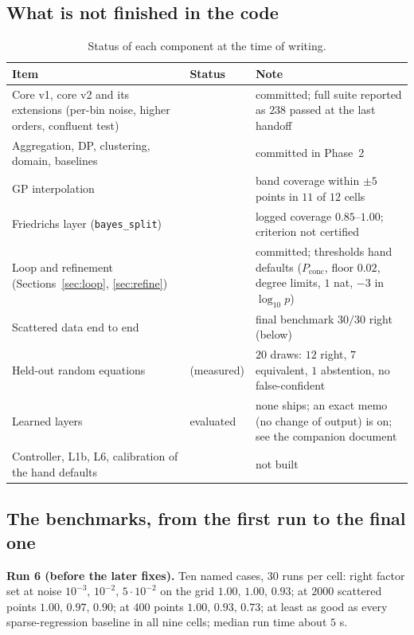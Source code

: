 \subsection{What is not finished in the code}
\begin{table}[!htb]
\centering\small
\begin{tabular}{@{}L{4.6cm}L{2.4cm}L{5.8cm}@{}}
\toprule
Item & Status & Note\\\midrule
Core v1, core v2 and its extensions (per-bin noise, higher orders, confluent test) & \impl{} & committed; full suite reported as $238$ passed at the last handoff\\
Aggregation, DP, clustering, domain, baselines & \impl{} & committed in Phase~2\\
GP interpolation & \impl{} & band coverage within $\pm5$ points in $11$ of $12$ cells\\
Friedrichs layer (\texttt{bayes\_split}) & \impl{} & logged coverage $0.85$--$1.00$; criterion not certified\\
Loop and refinement (Sections~\ref{sec:loop}, \ref{sec:refine}) & \impl{} & committed; thresholds hand defaults ($P_{\mathrm{conc}}$, floor $0.02$, degree limits, $1$ nat, $-3$ in $\log_{10}p$)\\
Scattered data end to end & \impl{} & final benchmark $30/30$ right (below)\\
Held-out random equations & \impl{} (measured) & $20$ draws: $12$ right, $7$ equivalent, $1$ abstention, no false-confident\\
Learned layers & evaluated & none ships; an exact memo (no change of output) is on; see the companion document\\
Controller, L1b, L6, calibration of the hand defaults & \plan{} & not built\\
\bottomrule
\end{tabular}
\caption{Status of each component at the time of writing.}
\end{table}

\subsection{The benchmarks, from the first run to the final one}
\textbf{Run 6 (before the later fixes).} Ten named cases, $30$ runs per cell: right factor set at noise $10^{-3},\,10^{-2},\,5\cdot10^{-2}$ on the grid $1.00,\,1.00,\,0.93$; at $2000$ scattered points $1.00,\,0.97,\,0.90$; at $400$ points $1.00,\,0.93,\,0.73$; at least as good as every sparse-regression baseline in all nine cells; median run time about $5$ s.

